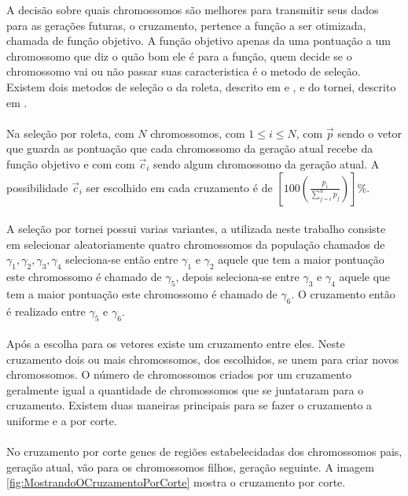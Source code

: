 \documentclass[10pt,a4paper]{article}
\begin{document}
A decisão sobre quais chromossomos são melhores para transmitir seus dados para as gerações futuras, o cruzamento, pertence a função a ser otimizada, chamada de função objetivo. A função objetivo apenas da uma pontuação a um chromossomo que diz o quão bom ele é para a função, quem decide se o chromossomo vai ou não passar suas caracteristica é o metodo de seleção. Existem dois metodos de seleção o da roleta, descrito em \cite{UFRGS-Apostila-GA} e \cite{Livro-De-IA}, e do tornei, descrito em   \cite{Livro-De-IA} .\\ \\
 Na seleção por roleta, com $N$ chromossomos, com $1 \le i \le N$, com $\vec{p}$ sendo o vetor que guarda as pontuação que cada chromossomo da geração atual recebe da função objetivo e com com $\vec{c}_i$ sendo algum chromossomo da geração atual. A possibilidade  $\vec{c}_i$ ser escolhido em cada cruzamento é de $\left [100 \left ( \frac{p_{i}}{\sum \limits_{j=i}^{n} p_{j}}\right ) \right ]\%$. \\ \\
A seleção por tornei possui varias variantes, a utilizada neste trabalho consiste em selecionar aleatoriamente quatro chromossomos da população chamados de $\gamma_{1},\gamma_{2},\gamma_{3},\gamma_{4}$ seleciona-se então entre $\gamma_{1}$ e $\gamma_{2}$ aquele que tem a maior pontuação este chromossomo é chamado de $\gamma_{5}$, depois seleciona-se  entre $\gamma_{3}$ e $\gamma_{4}$ aquele que tem a maior pontuação este chromossomo é chamado de $\gamma_{6}$. O cruzamento então é realizado entre $\gamma_{5}$ e $\gamma_{6}$. \\ \\
Após a escolha para os vetores existe um cruzamento entre eles. Neste cruzamento dois ou mais chromossomos, dos escolhidos, se unem para criar novos chromossomos. O número de chromossomos criados por um cruzamento geralmente igual a quantidade de chromossomos que se juntataram para o cruzamento. Existem duas maneiras principais para se fazer o cruzamento a uniforme e a por corte. \\ \\
No cruzamento por corte genes de regiões estabelecidadas dos chromossomos pais, geração atual, vão para os chromossomos filhos, geração seguinte. A imagem \ref{fig:MostrandoOCruzamentoPorCorte} mostra o cruzamento por corte. \\ 
\end{document}
